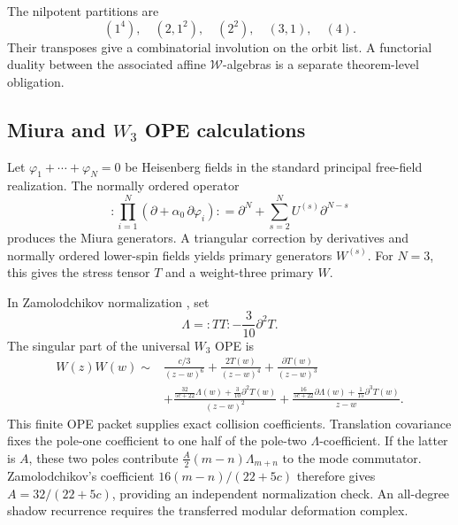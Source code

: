 \begin{computation}
\label{comp:sl4-ds-hierarchy}
\ClaimStatusComputed
The nilpotent partitions are
\[
(1^4),\quad(2,1^2),\quad(2^2),\quad(3,1),\quad(4).
\]
Their transposes give a combinatorial involution on the orbit list.
A functorial duality between the associated affine
\(\mathcal W\)-algebras is a separate theorem-level obligation.
\end{computation}

\subsection{Miura and \(W_3\) OPE calculations}
\label{sec:w3-verified-ope}

\begin{computation}
\label{comp:miura-w3}
\ClaimStatusProvedElsewhere
Let \(\varphi_1+\cdots+\varphi_N=0\) be Heisenberg fields in the
standard principal free-field realization.  The normally ordered
operator
\[
:\prod_{i=1}^{N}
\left(\partial+\alpha_0\,\partial\varphi_i\right):
=\partial^N+\sum_{s=2}^{N}U^{(s)}\partial^{N-s}
\]
produces the Miura generators.  A triangular correction by
derivatives and normally ordered lower-spin fields yields primary
generators \(W^{(s)}\).  For \(N=3\), this gives the stress tensor
\(T\) and a weight-three primary \(W\).
\end{computation}

\begin{computation}
\label{comp:w-infty-shadow-tower}
\label{comp:w3-shadow-tower-data}
\ClaimStatusProvedElsewhere
In Zamolodchikov normalization \cite{Zamolodchikov1985}, set
\[
\Lambda={:}TT{:}-\frac{3}{10}\partial^2T.
\]
The singular part of the universal \(W_3\) OPE is
\begin{align}
W(z)W(w)\sim{}&
\frac{c/3}{(z-w)^6}
+\frac{2T(w)}{(z-w)^4}
+\frac{\partial T(w)}{(z-w)^3}
\nonumber\\
&+\frac{\frac{32}{5c+22}\Lambda(w)
+\frac{3}{10}\partial^2T(w)}{(z-w)^2}
+\frac{\frac{16}{5c+22}\partial\Lambda(w)
+\frac1{15}\partial^3T(w)}{z-w}.
\label{eq:w3-wline-closed-form}
\end{align}
This finite OPE packet supplies exact collision coefficients.
Translation covariance fixes the pole-one coefficient to one half of
the pole-two \(\Lambda\)-coefficient.  If the latter is \(A\), these
two poles contribute \(\frac{A}{2}(m-n)\Lambda_{m+n}\) to the mode
commutator.  Zamolodchikov's coefficient
\(16(m-n)/(22+5c)\) therefore gives \(A=32/(22+5c)\), providing an
independent normalization check.
An all-degree shadow recurrence requires the transferred modular
deformation complex.
\end{computation}

